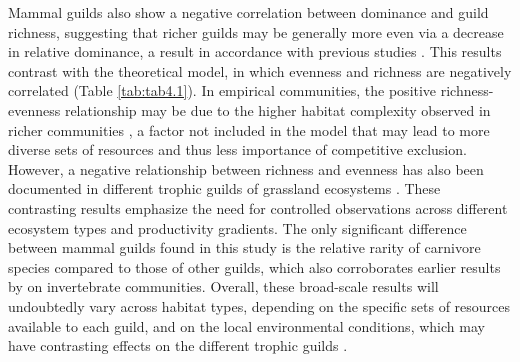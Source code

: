 Mammal guilds also show a negative correlation between dominance and guild richness, suggesting that richer guilds may be generally more even via a decrease in relative dominance, a result in accordance with previous studies \citep{Spencer2000,Dornelas2011}. This results contrast with the theoretical model, in which evenness and richness are negatively correlated (Table \ref{tab:tab4.1}). In empirical communities, the positive richness-evenness relationship may be due to the higher habitat complexity observed in richer communities \citep{Hurlbert2004}, a factor not included in the model that may lead to more diverse sets of resources and thus less importance of competitive exclusion. However, a negative relationship between richness and evenness has also been documented in different trophic guilds of grassland ecosystems \citep{Bock2007}. These contrasting results emphasize the need for controlled observations across different ecosystem types and productivity gradients. The only significant difference between mammal guilds found in this study is the relative rarity of carnivore species compared to those of other guilds, which also corroborates earlier results by \cite{Spencer2000} on invertebrate communities. Overall, these broad-scale results will undoubtedly vary across habitat types, depending on the specific sets of resources available to each guild, and on the local environmental conditions, which may have contrasting effects on the different trophic guilds \citep{Voigt2003}.

